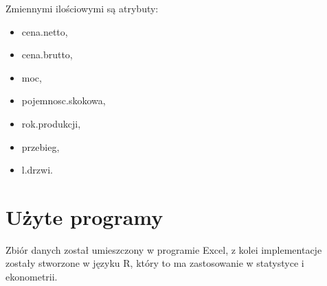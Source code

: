 \documentclass[12pt,a4paper]{report}
\begin{document}
Zmiennymi ilościowymi są atrybuty:
\begin{multicols}{3}
\begin{itemize}
 \item cena.netto,%
 \item cena.brutto,%
 \item moc,%
 \item pojemnosc.skokowa,%
 \item rok.produkcji, %
 \item przebieg,%
 \item l.drzwi. %
\end{itemize}
\end{multicols}

%

\section{Użyte programy}
Zbiór danych został umieszczony w programie Excel, z kolei implementacje zostały stworzone w języku R, który to ma zastosowanie w statystyce i ekonometrii. 
\end{document}
